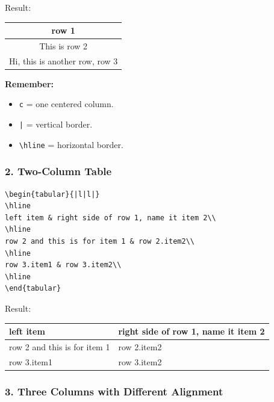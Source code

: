 \documentclass[a4paper,10pt]{article}
\begin{document}
Result:

\begin{center}
\begin{tabular}{|c|}
\hline
row 1 \\
\hline
This is row 2 \\
\hline
Hi, this is another row, row 3 \\
\hline
\end{tabular}
\end{center}

\textbf{Remember:}

\begin{itemize}
    \item \texttt{c} = one centered column.
    \item \texttt{|} = vertical border.
    \item \texttt{\textbackslash hline} = horizontal border.
\end{itemize}


\subsubsection{2. Two-Column Table}

\begin{verbatim}
\begin{tabular}{|l|l|}
\hline
left item & right side of row 1, name it item 2\\
\hline
row 2 and this is for item 1 & row 2.item2\\
\hline
row 3.item1 & row 3.item2\\
\hline
\end{tabular}
\end{verbatim}

Result:

\begin{center}
\begin{tabular}{|l|l|}
\hline
left item & right side of row 1, name it item 2\\
\hline
row 2 and this is for item 1 & row 2.item2\\
\hline
row 3.item1 & row 3.item2\\
\hline
\end{tabular}
\end{center}


\subsubsection{3. Three Columns with Different Alignment}
\end{document}
